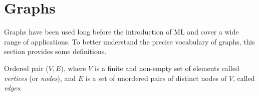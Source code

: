 
\section{Graphs}
\label{sec:background:graphs}

Graphs have been used long before the introduction of ML and cover a wide range
of applications. To better understand the precise vocabulary of graphs, this
section provides some definitions.

\begin{definition}[Graph]
  Ordered pair ($V, E$), where $V$ is a finite and non-empty set of elements
  called \emph{vertices} (or \emph{nodes}), and $E$ is a set of unordered pairs of
  distinct nodes of $V$, called \emph{edges}.
  \label{def:graph}
\end{definition}

